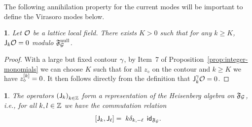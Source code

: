 \documentclass[12pt,oneside,english]{amsart}
\numberwithin{equation}{section}
\numberwithin{figure}{section}
\theoremstyle{plain}
\theoremstyle{plain}
\theoremstyle{plain}
\newtheorem{prop}[thm]{\protect\propositionname}
\theoremstyle{plain}
\newtheorem{lem}[thm]{\protect\lemmaname}
\theoremstyle{remark}
\theoremstyle{definition}
\theoremstyle{plain}
\theoremstyle{plain}
\numberwithin{thm}{section}
\providecommand{\lemmaname}{Lemma}
\providecommand{\propositionname}{Proposition}
\providecommand{\lemmaname}{Lemma}
\providecommand{\propositionname}{Proposition}
\providecommand{\lemmaname}{Lemma}
\providecommand{\propositionname}{Proposition}
\providecommand{\lemmaname}{Lemma}
\providecommand{\propositionname}{Proposition}
\begin{document}
The following annihilation property for the current modes will be
important to define the Virasoro modes below.
\begin{lem}
\label{lem:finite-energy-dgff}
Let ${\mathcal{O}}$ be a lattice local
field. There exists $K>0$ such that for any $k\geq K$, $ \mathsf{J}_{{k}}{\mathcal{O}}=0$
modulo $\mathfrak{F}^\mathrm{null}_{\mathcal{G}}$. 
\end{lem}
\begin{proof}
With a large but fixed contour $\gamma$,
by Item~7 of Proposition~\ref{prop:integer-monomials}
we can choose $K$ such that for all $z_{\diamond}$ on the contour and $k 
\geq K$ we have ${z_{\diamond}^{[{k}]}} = 0$.
It then follows directly from the definition that 
$\mathsf{J}_{{k}}^{\gamma} {\mathcal{O}} = 0$.
\end{proof}
\begin{prop}
\label{prop:gff-modes-heisenberg-algebra}
The operators
$\left( \mathsf{J}_{{k}}\right)_{k\in\mathbb{Z} }$ form a representation of the
Heisenberg algebra on $\mathfrak{F}_{\mathcal{G}}$, i.e.,
for all $k,l \in \mathbb{Z}$ we have the commutation relation
\[ \left[ \mathsf{J}_{{k}}, \mathsf{J}_{{\ell}} \right]
= \; k \delta_{k,-\ell} \; \, \mathsf{id}_{\mathfrak{F}_{\mathcal{G}}} .
\]
\end{prop}
\end{document}
